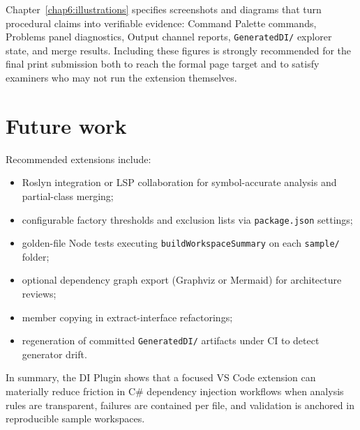 Chapter~\ref{chap6:illustrations} specifies screenshots and diagrams that turn procedural claims into verifiable evidence: Command Palette commands, Problems panel diagnostics, Output channel reports, \texttt{GeneratedDI/} explorer state, and merge results. Including these figures is strongly recommended for the final print submission both to reach the formal page target and to satisfy examiners who may not run the extension themselves.

\section{Future work}

Recommended extensions include:
\begin{itemize}
	\item Roslyn integration or LSP collaboration for symbol-accurate analysis and partial-class merging;
	\item configurable factory thresholds and exclusion lists via \texttt{package.json} settings;
	\item golden-file Node tests executing \texttt{buildWorkspaceSummary} on each \texttt{sample/} folder;
	\item optional dependency graph export (Graphviz or Mermaid) for architecture reviews;
	\item member copying in extract-interface refactorings;
	\item regeneration of committed \texttt{GeneratedDI/} artifacts under CI to detect generator drift.
\end{itemize}

In summary, the DI Plugin shows that a focused VS Code extension can materially reduce friction in C\# dependency injection workflows when analysis rules are transparent, failures are contained per file, and validation is anchored in reproducible sample workspaces.
